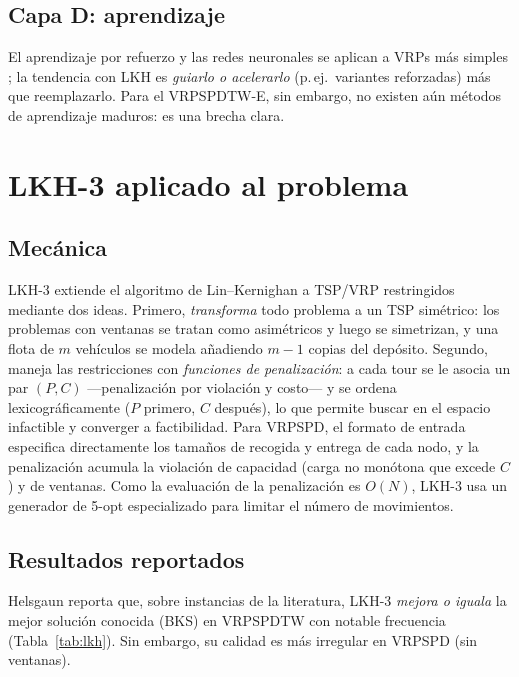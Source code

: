 \documentclass[conference]{IEEEtran}
\begin{document}
\subsection{Capa D: aprendizaje}
El aprendizaje por refuerzo y las redes neuronales se aplican a VRPs m\'as
simples \cite{wang2025drlalns,liu2023neural}; la tendencia con LKH es
\emph{guiarlo o acelerarlo} (p.\,ej.\ variantes reforzadas) m\'as que
reemplazarlo. Para el VRPSPDTW-E, sin embargo, no existen a\'un m\'etodos de
aprendizaje maduros: es una brecha clara.

\section{LKH-3 aplicado al problema}\label{sec:lkh}
\subsection{Mec\'anica}
LKH-3 \cite{helsgaun2017lkh3} extiende el algoritmo de Lin--Kernighan
\cite{linkernighan1973,helsgaun2000lkh,helsgaun2009kopt} a TSP/VRP restringidos
mediante dos ideas. Primero, \emph{transforma} todo problema a un TSP sim\'etrico:
los problemas con ventanas se tratan como asim\'etricos y luego se simetrizan, y
una flota de $m$ veh\'iculos se modela a\~nadiendo $m-1$ copias del dep\'osito.
Segundo, maneja las restricciones con \emph{funciones de penalizaci\'on}: a cada
tour se le asocia un par $(P,C)$ ---penalizaci\'on por violaci\'on y costo--- y
se ordena lexicogr\'aficamente ($P$ primero, $C$ despu\'es), lo que permite
buscar en el espacio infactible y converger a factibilidad. Para VRPSPD, el
formato de entrada especifica directamente los tama\~nos de recogida y entrega de
cada nodo, y la penalizaci\'on acumula la violaci\'on de capacidad (carga no
mon\'otona que excede $C$) y de ventanas. Como la evaluaci\'on de la
penalizaci\'on es $O(N)$, LKH-3 usa un generador de 5-opt especializado para
limitar el n\'umero de movimientos.

\subsection{Resultados reportados}
Helsgaun reporta que, sobre instancias de la literatura, LKH-3 \emph{mejora o
iguala} la mejor soluci\'on conocida (BKS) en VRPSPDTW con notable frecuencia
(Tabla~\ref{tab:lkh}). Sin embargo, su calidad es m\'as irregular en VRPSPD (sin
ventanas).
\end{document}
